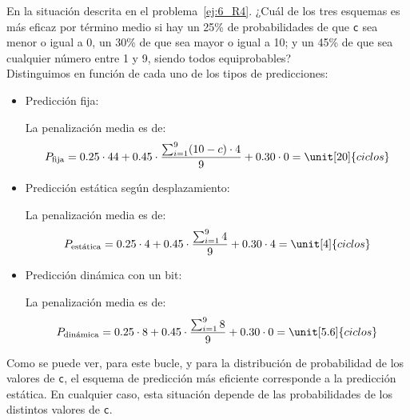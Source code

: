 \begin{ejercicio}
    En la situación descrita en el problema~\ref{ej:6_R4}. ¿Cuál de los tres esquemas es más eficaz por término medio si hay un 25\% de probabilidades de que \verb|c| sea menor o igual a 0, un 30\% de que sea mayor o igual a 10; y un 45\% de que sea cualquier número entre 1 y 9, siendo todos equiprobables?\\

    Distinguimos en función de cada uno de los tipos de predicciones:
    \begin{itemize}
        \item Predicción fija:
        
        La penalización media es de:
        \begin{equation*}
            P_{\text{fija}} = 0.25\cdot 44 + 0.45\cdot \dfrac{\sum_{i=1}^9(10-c)\cdot 4}{9} + 0.30\cdot 0 = \unit[20]{ciclos}
        \end{equation*}

        \item Predicción estática según desplazamiento:
        
        La penalización media es de:
        \begin{equation*}
            P_{\text{estática}} = 0.25\cdot 4 + 0.45\cdot \dfrac{\sum_{i=1}^9 4}{9} + 0.30\cdot 4 = \unit[4]{ciclos}
        \end{equation*}

        \item Predicción dinámica con un bit:
        
        La penalización media es de:
        \begin{equation*}
            P_{\text{dinámica}} = 0.25\cdot 8 + 0.45\cdot \dfrac{\sum_{i=1}^9 8}{9} + 0.30\cdot 0 = \unit[5.6]{ciclos}
        \end{equation*}
    \end{itemize}

    Como se puede ver, para este bucle, y para la distribución de probabilidad de los valores de \verb|c|, el esquema de
    predicción más eficiente corresponde a la predicción estática.
    En cualquier caso, esta situación depende de las probabilidades de los distintos valores de \verb|c|.
\end{ejercicio}

